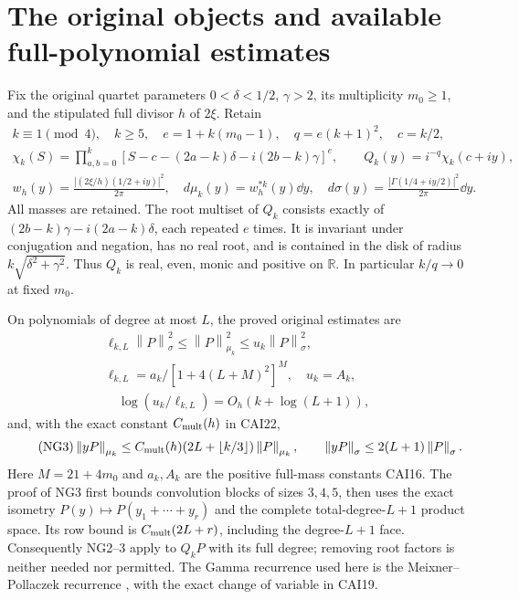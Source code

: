 \documentclass[11pt]{article}
\newcommand{\R}{\mathbb R}\newcommand{\C}{\mathbb C}
\newcommand{\norm}[1]{\left\lVert#1\right\rVert}
\begin{document}
\section{The original objects and available full-polynomial estimates}
Fix the original quartet parameters $0<\delta<1/2$, $\gamma>2$, its
multiplicity $m_0\ge1$, and the stipulated full divisor $h$ of $2\xi$.
Retain
\begin{equation}\tag{NG1}
 \begin{gathered}
 k\equiv1\pmod4,\quad k\ge5,\quad e=1+k(m_0-1),\quad q=e(k+1)^2,\quad c=k/2,\\
 \chi_k(S)=\prod_{a,b=0}^k
 [S-c-(2a-k)\delta-i(2b-k)\gamma]^e,\qquad
 Q_k(y)=i^{-q}\chi_k(c+iy),\\
 w_h(y)=\frac{|(2\xi/h)(1/2+iy)|^2}{2\pi},\quad
 d\mu_k(y)=w_h^{*k}(y)\dd y,\quad
 d\sigma(y)=\frac{|\Gamma(1/4+iy/2)|^2}{2\pi}\dd y.
 \end{gathered}
\end{equation}
All masses are retained. The root multiset of $Q_k$ consists exactly of
$(2b-k)\gamma-i(2a-k)\delta$, each repeated $e$ times. It is invariant
under conjugation and negation, has no real root, and is contained in the
disk of radius $k\sqrt{\delta^2+\gamma^2}$. Thus $Q_k$ is real, even,
monic and positive on $\R$. In particular $k/q\to0$ at fixed $m_0$.

On polynomials of degree at most $L$, the proved original estimates are
\begin{equation}\tag{NG2}
 \begin{gathered}
 \ell_{k,L}\norm P_\sigma^2\le\norm P_{\mu_k}^2
 \le u_k\norm P_\sigma^2,\\
 \ell_{k,L}=a_k/[1+4(L+M)^2]^M,
 \quad u_k=A_k,\\
 \quad \log(u_k/\ell_{k,L})=O_h(k+\log(L+1)),
 \end{gathered}
\end{equation}
and, with the exact constant $C_{\rm mult}(h)$ in CAI22,
\begin{equation}\tag{NG3}
 \norm{yP}_{\mu_k}\le C_{\rm mult}(h)(2L+\lfloor k/3\rfloor)
                    \norm P_{\mu_k},\qquad
 \norm{yP}_\sigma\le2(L+1)\norm P_\sigma.
\end{equation}
Here $M=21+4m_0$ and $a_k,A_k$ are the positive full-mass constants
CAI16. The proof of NG3 first bounds convolution blocks of sizes $3,4,5$,
then uses the exact isometry $P(y)\mapsto P(y_1+\cdots+y_r)$ and the
complete total-degree-$L+1$ product space. Its row bound is
$C_{\rm mult}(2L+r)$, including the degree-$L+1$ face. Consequently
NG2--3 apply to $Q_kP$ with its full degree; removing root factors is
neither needed nor permitted. The Gamma recurrence used here is the
Meixner--Pollaczek recurrence \cite[18.22.8,18.23.7]{dlmf}, with the exact
change of variable in CAI19.
\end{document}
